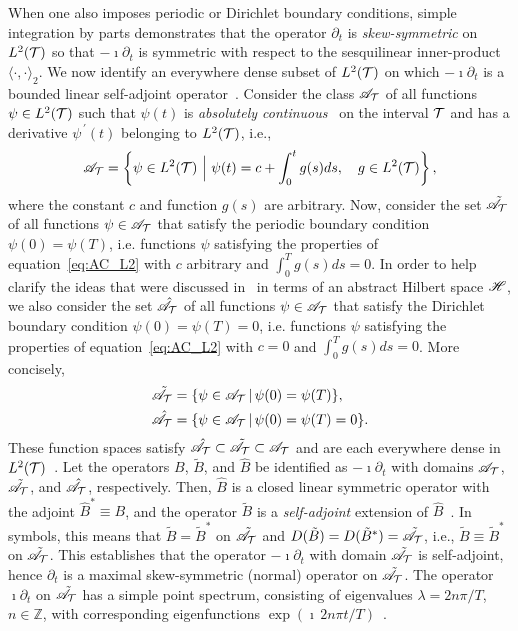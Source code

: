 \documentclass[amsa]{ipart}
\begin{document}
When one also imposes periodic or Dirichlet boundary conditions,
simple integration by parts demonstrates that the operator $\partial_t$ is
\emph{skew-symmetric} on $L^2(\mathcal{T})$ so that $-\imath\partial_t$ is symmetric with
respect to the sesquilinear inner-product $\langle\cdot,\cdot\rangle_2$. We now identify an
everywhere dense subset of $L^2(\mathcal{T})$ on which $-\imath\partial_t$ is a bounded
linear self-adjoint operator~\cite{Reed-1980,Stone:64}. Consider the
class $\mathscr{A}_{\mathcal{T}}$ of all functions $\psi\in L^2(\mathcal{T})$ such that $\psi(t)$ is
\emph{absolutely continuous}~\cite{Royden:1988:RA} on the interval
$\mathcal{T}$ and has a derivative $\psi^{\,\prime}(t)$ belonging to $L^2(\mathcal{T})$,
i.e.,~\cite{Stone:64,Royden:1988:RA}     
%
\begin{align}\label{eq:AC_L2}
  \As_{\Tc}=
     \left\{
       \psi\in L^2(\Tc) \ \Big| \ \psi(t)=c+\int_0^tg(s)ds,
       \quad  g\in L^2(\Tc)
     \right\},
\end{align}
%
where the constant $c$ and function $g(s)$ are
arbitrary. Now, consider the set $\tilde{\mathscr{A}}_{\mathcal{T}}$ of all
functions $\psi\in\mathscr{A}_{\mathcal{T}}$ that satisfy the periodic boundary condition
$\psi(0)=\psi(T)$, i.e. functions $\psi$ satisfying the properties of 
equation~\eqref{eq:AC_L2} with $c$ arbitrary and
$\int_0^Tg(s)ds=0$. In order to help clarify the ideas that were
discussed in~ in terms of an abstract  
Hilbert space $\mathscr{H}$, we also consider the set $\hat{\mathscr{A}}_{\mathcal{T}}$ of all
functions $\psi\in\mathscr{A}_{\mathcal{T}}$ that satisfy the Dirichlet boundary condition
$\psi(0)=\psi(T)=0$, i.e. functions $\psi$ satisfying the properties of
equation~\eqref{eq:AC_L2} with $c=0$ and $\int_0^Tg(s)ds=0$. More
concisely,  
%
\begin{align}\label{eq:AC_BC}
  \tilde{\As}_{\Tc}&=\{\psi\in\As_{\Tc} \,|\, \psi(0)=\psi(T)\},
  \\
  \hat{\As}_{\Tc}&=\{\psi\in\As_{\Tc} \,|\, \psi(0)=\psi(T)=0\}.
  \notag
\end{align}
%
These function spaces satisfy
$\hat{\mathscr{A}}_{\mathcal{T}}\subset\tilde{\mathscr{A}}_{\mathcal{T}}\subset\mathscr{A}_{\mathcal{T}}$ and are each everywhere
dense in $L^2(\mathcal{T})$~\cite{Stone:64}. Let the operators $B$,
$\tilde{B}$, and $\hat{B}$ be identified as $-\imath\partial_t$ with domains
$\mathscr{A}_{\mathcal{T}}$, $\tilde{\mathscr{A}}_{\mathcal{T}}$, and $\hat{\mathscr{A}}_{\mathcal{T}}$,
respectively. Then, $\hat{B}$ is a closed linear symmetric operator
with the adjoint $\hat{B}^*\equiv B$, and the operator $\tilde{B}$ is a
\emph{self-adjoint} extension of $\hat{B}$~\cite{Stone:64}. In
symbols, this means that $\tilde{B}=\tilde{B}^*$ on
$\tilde{\mathscr{A}}_{\mathcal{T}}$ and
$D(\tilde{B})=D(\tilde{B}^*)=\tilde{\mathscr{A}}_{\mathcal{T}}$,
i.e., $\tilde{B}\equiv\tilde{B}^*$ on $\tilde{\mathscr{A}}_{\mathcal{T}}$. This establishes
that the operator $-\imath\partial_t$ with domain $\tilde{\mathscr{A}}_{\mathcal{T}}$ is
self-adjoint, hence $\partial_t$ is a maximal skew-symmetric (normal)
operator on $\tilde{\mathscr{A}}_{\mathcal{T}}$. The operator $\imath\partial_t$ on
$\tilde{\mathscr{A}}_{\mathcal{T}}$ has a simple point spectrum, consisting of
eigenvalues $\lambda=2n\pi/T$, $n\in\mathbb{Z}$, with corresponding
eigenfunctions $\exp(\imath\,2n\pi t/T)$~\cite{Stone:64}.
\end{document}
